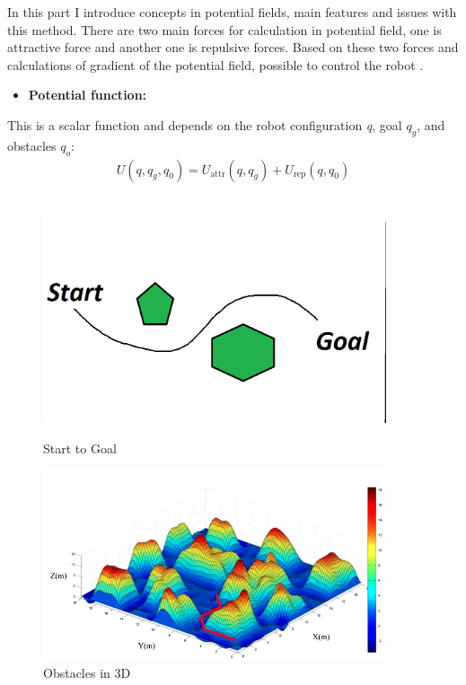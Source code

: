 In this part I introduce concepts in potential fields, main features and issues with this method.  There are two main forces for calculation in potential field, one is attractive force and another one is repulsive forces. Based on these two forces and calculations of gradient of the potential field, possible to control the robot \cite{Potentialfield}.    
\begin{itemize}
    \item  \textbf{ Potential function: }
\end{itemize}
 This is a scalar function and depends on the robot configuration \textit{q}, goal $q_{g}$, and obstacles $q_{o}$:\cite{khatib1986real} \\

\begin{equation}
\begin{aligned}
U(q, q_g, q_0) = U_{\text{attr}}(q, q_g) + U_{\text{rep}}(q, q_0)  
\end{aligned}
\label{eqn:potential function}
\end{equation} \\

\begin{figure}[h]
    \centering
    \begin{minipage}{0.45\textwidth}
        \centering
        \includegraphics[width=0.9\textwidth]{Figures/graph.png} %
        \caption{Start to Goal}
    \end{minipage}\hfill
    \begin{minipage}{0.45\textwidth}
        \centering
        \includegraphics[width=0.9\textwidth]{Figures/graph2.PNG} %
        \caption{Obstacles in 3D}
    \end{minipage}
\end{figure}

